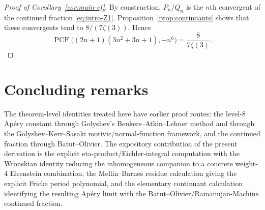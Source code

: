 \documentclass[11pt]{amsart}
\numberwithin{equation}{section}
\theoremstyle{plain}
\theoremstyle{definition}
\theoremstyle{remark}
\DeclareMathOperator{\PCF}{PCF}
\begin{document}
\begin{proof}[Proof of Corollary~\ref{cor:main-cf}]
By construction, $P_n/Q_n$ is the $n$th convergent of the continued fraction \eqref{eq:intro-Z1}. Proposition~\ref{prop:continuants} shows that these convergents tend to $8/(7\zeta(3))$. Hence
\[
\PCF\bigl((2n+1)(3n^2+3n+1),-n^6\bigr)=\frac{8}{7\zeta(3)}.
\]
\end{proof}

\section{Concluding remarks}\label{sec:conclusion}

The theorem-level identities treated here have earlier proof routes: the
level-$8$ Apéry constant through Golyshev's Beukers--Atkin--Lehner method and
through the Golyshev--Kerr--Sasaki motivic/normal-function framework, and
the continued fraction through Batut--Olivier. The expository contribution
of the present derivation is the explicit eta-product/Eichler-integral
computation with the Wronskian identity reducing the inhomogeneous companion
to a concrete weight-$4$ Eisenstein combination, the Mellin--Barnes residue
calculation giving the explicit Fricke period polynomial, and the elementary
continuant calculation identifying the resulting Apéry limit with the
Batut--Olivier/Ramanujan-Machine continued fraction.
\end{document}
